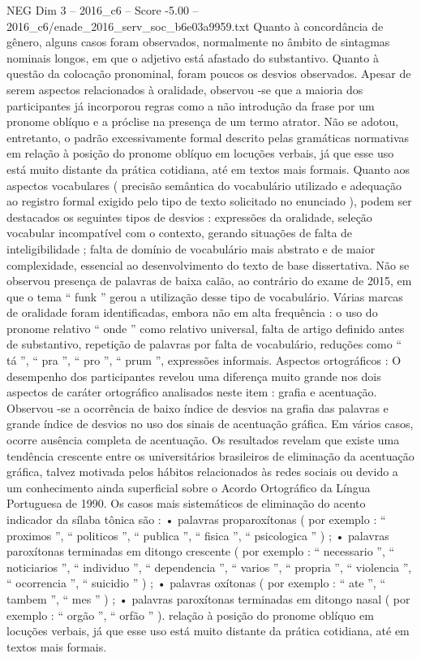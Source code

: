 \begin{textsample}{NEG Dim 3 – 2016\_c6 – Score -5.00 – 2016\_c6/enade\_2016\_serv\_soc\_b6e03a9959.txt}
Quanto à concordância de gênero, alguns casos foram observados, normalmente no âmbito de sintagmas nominais longos, em que o adjetivo está afastado do substantivo.
Quanto à questão da colocação pronominal, foram poucos os desvios observados.
Apesar de serem aspectos relacionados à oralidade, observou -se que a maioria dos participantes já incorporou regras como a não introdução da frase por um pronome oblíquo e a próclise na presença de um termo atrator.
Não se adotou, entretanto, o padrão excessivamente formal descrito pelas gramáticas normativas em relação à posição do pronome oblíquo em locuções verbais, já que esse uso está muito distante da prática cotidiana, até em textos mais formais.
Quanto aos aspectos vocabulares ( precisão semântica do vocabulário utilizado e adequação ao registro formal exigido pelo tipo de texto solicitado no enunciado ), podem ser destacados os seguintes tipos de desvios : expressões da oralidade, seleção vocabular incompatível com o contexto, gerando situações de falta de inteligibilidade ; falta de domínio de vocabulário mais abstrato e de maior complexidade, essencial ao desenvolvimento do texto de base dissertativa.
Não se observou presença de palavras de baixa calão, ao contrário do exame de 2015, em que o tema “ funk ” gerou a utilização desse tipo de vocabulário.
Várias marcas de oralidade foram identificadas, embora não em alta frequência : o uso do pronome relativo “ onde ” como relativo universal, falta de artigo definido antes de substantivo, repetição de palavras por falta de vocabulário, reduções como “ tá ”, “ pra ”, “ pro ”, “ prum ”, expressões informais.
Aspectos ortográficos : O desempenho dos participantes revelou uma diferença muito grande nos dois aspectos de caráter ortográfico analisados neste item : grafia e acentuação.
Observou -se a ocorrência de baixo índice de desvios na grafia das palavras e grande índice de desvios no uso dos sinais de acentuação gráfica.
Em vários casos, ocorre ausência completa de acentuação.
Os resultados revelam que existe uma tendência crescente entre os universitários brasileiros de eliminação da acentuação gráfica, talvez motivada pelos hábitos relacionados às redes sociais ou devido a um conhecimento ainda superficial sobre o Acordo Ortográfico da Língua Portuguesa de 1990.
Os casos mais sistemáticos de eliminação do acento indicador da sílaba tônica são : • palavras proparoxítonas ( por exemplo : “ proximos ”, “ politicos ”, “ publica ”, “ fisica ”, “ psicologica ” ) ; • palavras paroxítonas terminadas em ditongo crescente ( por exemplo : “ necessario ”, “ noticiarios ”, “ individuo ”, “ dependencia ”, “ varios ”, “ propria ”, “ violencia ”, “ ocorrencia ”, “ suicidio ” ) ; • palavras oxítonas ( por exemplo : “ ate ”, “ tambem ”, “ mes ” ) ; • palavras paroxítonas terminadas em ditongo nasal ( por exemplo : “ orgão ”, “ orfão ” ). relação à posição do pronome oblíquo em locuções verbais, já que esse uso está muito distante da prática cotidiana, até em textos mais formais.

\end{textsample}
